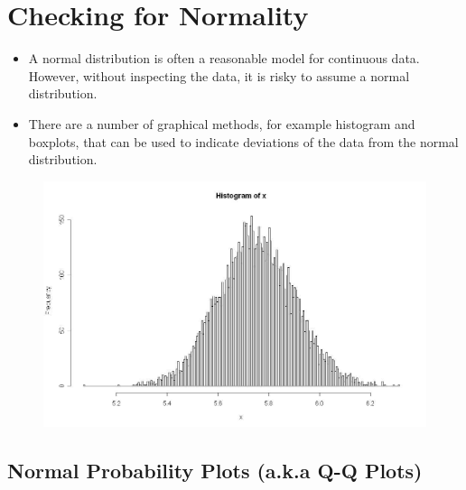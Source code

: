 \documentclass[]{report}
\begin{document}
\section*{Checking for Normality}

\begin{itemize}
	\item A normal distribution is often a reasonable model for continuous data. However, without inspecting the data, it is risky to assume a normal distribution. \item  There are a number of graphical methods, for example histogram and boxplots, that can be used to indicate deviations of the data from the normal distribution. 
	
\end{itemize}

\begin{figure}[h!]
	\centering
	\includegraphics[width=0.55\linewidth]{images/normal}
\end{figure}



\subsection*{Normal Probability Plots (a.k.a Q-Q Plots)}
\end{document}
